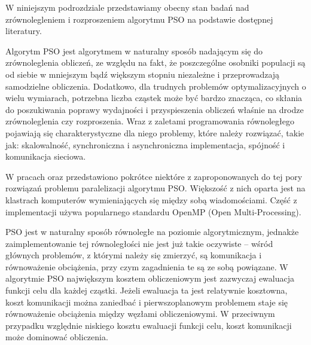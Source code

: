 \documentclass[12pt, twoside, openany, abstract=on]{report}
\theoremstyle{definition}
\begin{document}

W niniejszym podrozdziale przedstawiamy obecny stan badań nad zrównolegleniem i rozproszeniem algorytmu PSO na podstawie dostępnej literatury.

Algorytm PSO jest algorytmem w naturalny sposób nadającym się do zrównoleglenia obliczeń, ze względu na fakt, że poszczególne osobniki populacji są od siebie w mniejszym bądź większym stopniu niezależne i przeprowadzają samodzielne obliczenia. Dodatkowo, dla trudnych problemów optymalizacyjnych o wielu wymiarach, potrzebna liczba cząstek może być bardzo znacząca, co skłania do poszukiwania poprawy wydajności i przyspieszenia obliczeń właśnie na drodze zrównoleglenia czy rozproszenia. 
Wraz z zaletami programowania równoległego pojawiają się charakterystyczne dla niego problemy, które należy rozwiązać, takie jak: skalowalność, synchroniczna i asynchroniczna implementacja, spójność i komunikacja sieciowa. 

W pracach \cite{AccelParallelPso} oraz \cite{ComparisonParallelGpuPso} przedstawiono pokrótce niektóre z zaproponowanych do tej pory rozwiązań problemu paralelizacji algorytmu PSO. Większość z nich oparta jest na klastrach komputerów wymieniających się między sobą wiadomościami.
Część z implementacji używa popularnego standardu OpenMP (Open Multi-Processing). 


PSO jest w naturalny sposób równoległe na poziomie algorytmicznym, jednakże zaimplementowanie tej równoległości nie jest już takie oczywiste – wśród głównych problemów, z którymi należy się zmierzyć, są komunikacja i równoważenie obciążenia, przy czym zagadnienia te są ze sobą powiązane. W algorytmie PSO największym kosztem obliczeniowym jest zazwyczaj ewaluacja funkcji celu dla każdej cząstki. Jeżeli ewaluacja ta jest relatywnie kosztowna, koszt komunikacji można zaniedbać i pierwszoplanowym problemem staje się równoważenie obciążenia między węzłami obliczeniowymi. W przeciwnym przypadku względnie niskiego kosztu ewaluacji funkcji celu, koszt komunikacji może dominować obliczenia.
\end{document}
